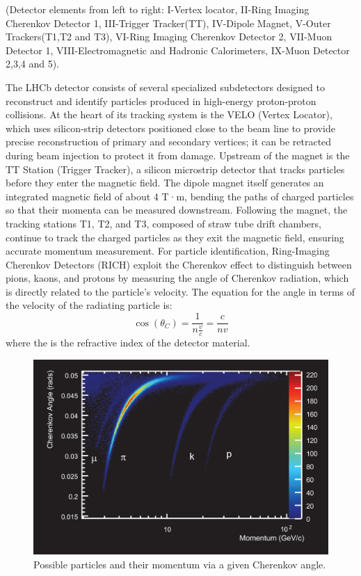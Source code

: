 (Detector elements from left to right:  I-Vertex locator, II-Ring Imaging Cherenkov Detector 1, III-Trigger Tracker(TT), IV-Dipole Magnet, V-Outer Trackers(T1,T2 and T3), VI-Ring Imaging Cherenkov Detector 2, VII-Muon Detector 1, VIII-Electromagnetic and Hadronic Calorimeters, IX-Muon Detector 2,3,4 and 5).

The LHCb detector consists of several specialized subdetectors designed to reconstruct and identify particles produced in high-energy proton-proton collisions. At the heart of its tracking system is the VELO (Vertex Locator), which uses silicon-strip detectors positioned close to the beam line to provide precise reconstruction of primary and secondary vertices; it can be retracted during beam injection to protect it from damage. Upstream of the magnet is the TT Station (Trigger Tracker), a silicon microstrip detector that tracks particles before they enter the magnetic field. The dipole magnet itself generates an integrated magnetic field of about 4 T·m, bending the paths of charged particles so that their momenta can be measured downstream. Following the magnet, the tracking stations T1, T2, and T3, composed of straw tube drift chambers, continue to track the charged particles as they exit the magnetic field, ensuring accurate momentum measurement. For particle identification, Ring-Imaging Cherenkov Detectors (RICH) exploit the Cherenkov effect to distinguish between pions, kaons, and protons by measuring the angle of Cherenkov radiation, which is directly related to the particle’s velocity. The equation for the angle in terms of the velocity of the radiating particle is:
    \[
    \cos(\theta_{C}) = \frac{1}{n \frac{v}{c}} = \frac{c}{n v}
    \]
    where the  is the refractive index of the detector material.
    \begin{figure}[H]
        \centering
        \includegraphics[width=0.59\linewidth]{images/RICH_ID.png}
        \caption{Possible particles and their momentum via a given Cherenkov angle.}
        \label{RICH}
    \end{figure}
